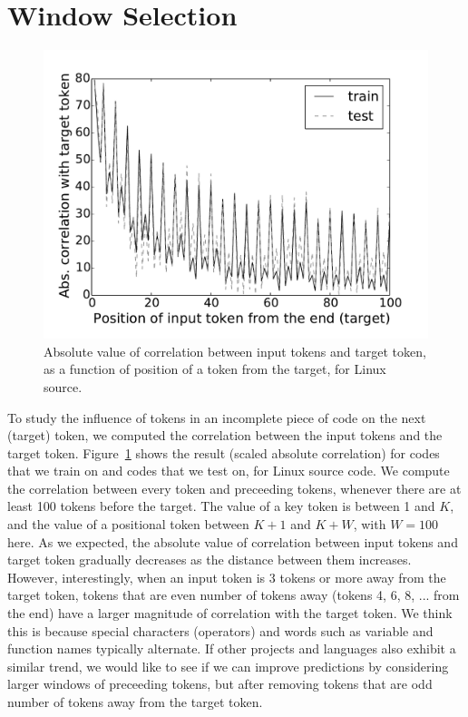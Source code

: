 \vspace{-15pt}
\section{Window Selection}
\label{sec:window}

\begin{figure}
  \centering
  \includegraphics[width=\linewidth]{figs/correlation.pdf}
  \caption{Absolute value of correlation between input tokens and target token,
    as a function of position of a token from the target, for Linux source.}
  \label{fig:correlation}
\end{figure}

\noindent
To study the influence of tokens in an incomplete piece of code on the next
(target) token, we computed the correlation between the input tokens and the
target token.
Figure~\ref{fig:correlation} shows the result (scaled absolute correlation) for
codes that we train on and codes that we test on, for Linux
source code.
We compute the correlation between every token and preceeding tokens, whenever
there are at least 100 tokens before the target.
The value of a key token is between 1 and $K$, and the value of a positional
token between $K+1$ and $K+W$, with $W=100$ here.
As we expected, the absolute value of correlation between input tokens and
target token gradually decreases as the distance between them increases.
However, interestingly, when an input token is 3 tokens or more away from the
target token, tokens that are even number of tokens away (tokens 4, 6, 8, ...
from the end) have a larger magnitude of correlation with the target token.
We think this is because special characters (operators) and words such as variable and
function names typically alternate. If other projects and languages
also exhibit a similar trend, we would like to see if we can improve
predictions by considering larger windows of preceeding tokens, but after
removing tokens that are odd number of tokens away from the target token.
